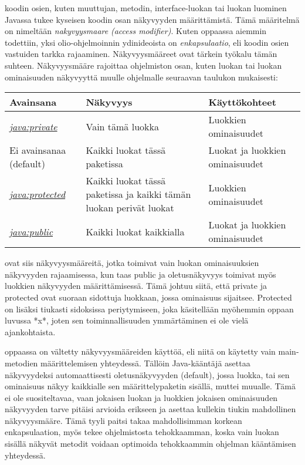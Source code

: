 \documentclass{tufte-book}
\newcommand{\eng}[1]{\textit{(#1)}}
\newcommand{\new}[1]{\textit{\gls{#1}}}
\newcommand{\neweng}[2]{\new{#1} \eng{#2}}
\newcommand{\java}[1]{\underline{\gls{java:#1}}}
\newcommand{\newjava}[1]{\textit{\java{#1}}}
\begin{document}
 koodin osien, kuten muuttujan, metodin, interface-luokan tai luokan
luominen Javassa tukee kyseisen koodin osan näkyvyyden määrittämistä. Tämä määritelmä on nimeltään 
\neweng{nakyvyysmaare}{access modifier}. Kuten oppaassa aiemmin todettiin, yksi olio-ohjelmoinnin
ydinideoista on \new{enkapsulaatio}, eli koodin osien vastuiden tarkka rajaaminen. Näkyvyysmääreet
ovat tärkein työkalu tämän suhteen. Näkyvyysmääre rajoittaa ohjelmiston osan, kuten luokan tai
luokan ominaisuuden näkyvyyttä muulle ohjelmalle seuraavan taulukon mukaisesti:

\bigskip
\begin{center}
\footnotesize
\begin{tabular}{lll}
\toprule
Avainsana & Näkyvyys & Käyttökohteet \\
\midrule
\newjava{private} & Vain tämä luokka & Luokkien ominaisuudet \\
\addlinespace
Ei avainsanaa (default) & Kaikki luokat tässä paketissa & Luokat ja luokkien ominaisuudet \\
\addlinespace
\newjava{protected} & Kaikki luokat tässä paketissa ja kaikki tämän luokan perivät luokat &
Luokkien ominaisuudet \\
\addlinespace
\newjava{public} & Kaikki luokat kaikkialla & Luokat ja luokkien ominaisuudet \\
\bottomrule
\end{tabular}
\end{center}

 ovat siis näkyvyysmääreitä, jotka toimivat vain luokan
ominaisuuksien näkyvyyden rajaamisessa, kun taas public ja oletusnäkyvyys toimivat myös luokkien
näkyvyyden määrittämisessä. Tämä johtuu siitä, että private ja protected ovat suoraan sidottuja
luokkaan, jossa ominaisuus sijaitsee. Protected on lisäksi tiukasti sidoksissa periytymiseen, joka
käsitellään myöhemmin oppaan luvussa *x*, %
joten sen toiminnallisuuden ymmärtäminen ei ole vielä ajankohtaista.

 oppaassa on vältetty näkyvyysmääreiden käyttöä, eli niitä on käytetty
vain main-metodien määrittelemisen yhteydessä. Tällöin Java-kääntäjä asettaa näkyvyydeksi
automaattisesti oletusnäkyvyyden (default), jossa luokka, tai sen ominaisuus näkyy kaikkialle
sen määrittelypaketin sisällä, muttei muualle. Tämä ei ole suositeltavaa, vaan jokaisen luokan
ja luokkien jokaisen ominaisuuden näkyvyyden tarve pitäisi arvioida erikseen ja asettaa kullekin
tiukin mahdollinen näkyvyysmääre. Tämä tyyli paitsi takaa mahdollisimman korkean enkapsulaation,
myös tekee ohjelmistosta tehokkaamman, koska vain luokan sisällä näkyvät metodit voidaan optimoida
tehokkaammin ohjelman kääntämisen yhteydessä.
\end{document}
